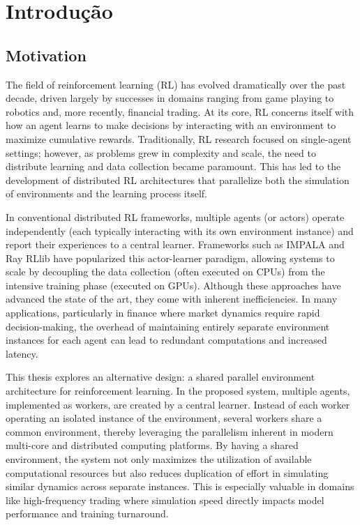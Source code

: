 
\chapter[Introduction]{Introdução}
\label{ch:introduction}

\section{Motivation}
\label{sec:motivation}

The field of reinforcement learning (RL) has evolved dramatically over the past decade,
driven largely by successes in domains ranging from game playing to robotics and, more recently, financial trading.
At its core, RL concerns itself with how an agent learns to make decisions by interacting with an environment to maximize cumulative rewards.
Traditionally, RL research focused on single-agent settings;
however, as problems grew in complexity and scale, the need to distribute learning and data collection became paramount.
This has led to the development of distributed RL architectures that parallelize both the simulation of environments and the learning process itself.

In conventional distributed RL frameworks, multiple agents (or actors) operate independently (each typically interacting with
its own environment instance) and report their experiences to a central learner.
Frameworks such as IMPALA and Ray RLlib have popularized this actor-learner paradigm,
allowing systems to scale by decoupling the data collection (often executed on CPUs) from the intensive training phase (executed on GPUs).
Although these approaches have advanced the state of the art, they come with inherent inefficiencies.
In many applications, particularly in finance where market dynamics require rapid decision-making,
the overhead of maintaining entirely separate environment instances for each agent can lead to redundant computations and increased latency.


This thesis explores an alternative design: a shared parallel environment architecture for reinforcement learning.
In the proposed system, multiple agents, implemented as workers, are created by a central learner.
Instead of each worker operating an isolated instance of the environment, several workers share a common environment,
thereby leveraging the parallelism inherent in modern multi-core and distributed computing platforms.
By having a shared environment, the system not only maximizes the utilization of available
computational resources but also reduces duplication of effort in simulating similar dynamics across separate instances.
This is especially valuable in domains like high-frequency trading where simulation speed directly impacts model performance and training turnaround.


